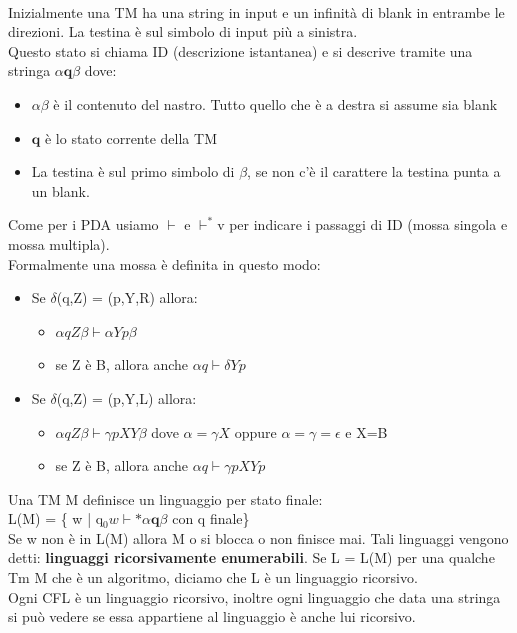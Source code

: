 \documentclass[12pt]{article}
\begin{document}
\\ Inizialmente una TM ha una string in input e un infinità di blank in entrambe le direzioni. La testina è sul simbolo di input più a sinistra. 
\\ Questo stato si chiama ID (descrizione istantanea) e si descrive tramite una stringa $\alpha \textbf{q} \beta$ dove:
\begin{itemize}
    \item $\alpha\beta$ è il contenuto del nastro. Tutto quello che è a destra si assume sia blank
    \item $\textbf{q}$ è lo stato corrente della TM 
    \item La testina è sul primo simbolo di $\beta$, se non c'è il carattere la testina punta a un blank.
\end{itemize}
Come per i PDA usiamo $\vdash$ e $\vdash^*$v per indicare i passaggi di ID (mossa singola e mossa multipla).
\\ Formalmente una mossa è definita in questo modo:
\begin{itemize}
    \item Se $\delta$(q,Z) = (p,Y,R) allora:
        \begin{itemize}
            \item $\alpha qZ \beta \vdash \alpha Y p \beta$
            \item se Z è B, allora anche $\alpha q \vdash \delta Yp$
        \end{itemize}
    \item Se $\delta$(q,Z) = (p,Y,L) allora:
        \begin{itemize}
            \item $\alpha qZ \beta \vdash \gamma pXY \beta$ dove $\alpha = \gamma X$ oppure $\alpha=\gamma=\epsilon$ e X=B
            \item se Z è B, allora anche $\alpha q \vdash \gamma p X Yp$
        \end{itemize}
\end{itemize}
Una TM M definisce un linguaggio per stato finale: 
\\ L(M) = \{ w | q$_0w\vdash * \alpha \textbf{q} \beta$ con q finale\}
\\ Se w non è in L(M) allora M o si blocca o non finisce mai. Tali linguaggi vengono detti: \textbf{linguaggi ricorsivamente enumerabili}. Se L = L(M) per una qualche Tm M che è un algoritmo, diciamo che L è un linguaggio ricorsivo.
\\ Ogni CFL è un linguaggio ricorsivo, inoltre ogni linguaggio che data una stringa si può vedere se essa appartiene al linguaggio è anche lui ricorsivo.
\end{document}
